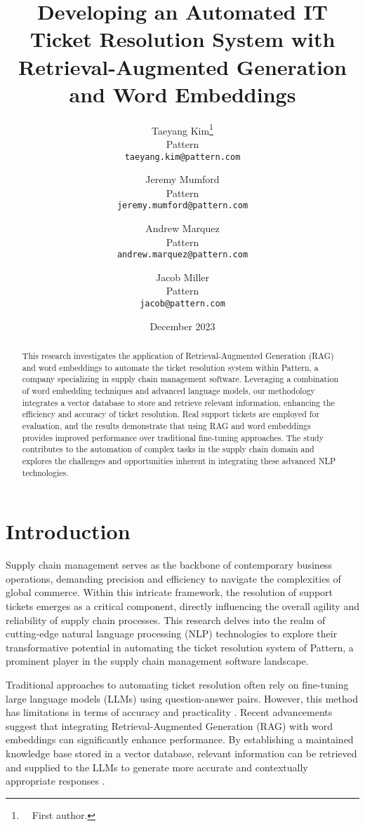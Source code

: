 \documentclass[11pt]{article}
\title{Developing an Automated IT Ticket Resolution System with Retrieval-Augmented Generation and Word Embeddings}
\author{
Taeyang Kim\thanks{\ \ First author.} \\
Pattern \\
\texttt{taeyang.kim@pattern.com}
\and
Jeremy Mumford \\
Pattern \\
\texttt{jeremy.mumford@pattern.com}
\and
Andrew Marquez \\
Pattern \\
\texttt{andrew.marquez@pattern.com}
\and
Jacob Miller \\
Pattern \\
\texttt{jacob@pattern.com}
}
\date{December 2023}
\begin{document}
\maketitle

\begin{abstract}
This research investigates the application of Retrieval-Augmented Generation (RAG) and word embeddings to automate the ticket resolution system within Pattern, a company specializing in supply chain management software. Leveraging a combination of word embedding techniques and advanced language models, our methodology integrates a vector database to store and retrieve relevant information, enhancing the efficiency and accuracy of ticket resolution. Real support tickets are employed for evaluation, and the results demonstrate that using RAG and word embeddings provides improved performance over traditional fine-tuning approaches. The study contributes to the automation of complex tasks in the supply chain domain and explores the challenges and opportunities inherent in integrating these advanced NLP technologies.
\end{abstract}

\section{Introduction}
Supply chain management serves as the backbone of contemporary business operations, demanding precision and efficiency to navigate the complexities of global commerce. Within this intricate framework, the resolution of support tickets emerges as a critical component, directly influencing the overall agility and reliability of supply chain processes. This research delves into the realm of cutting-edge natural language processing (NLP) technologies to explore their transformative potential in automating the ticket resolution system of Pattern, a prominent player in the supply chain management software landscape.

Traditional approaches to automating ticket resolution often rely on fine-tuning large language models (LLMs) using question-answer pairs. However, this method has limitations in terms of accuracy and practicality \cite{zhang2020enhancing}. Recent advancements suggest that integrating Retrieval-Augmented Generation (RAG) with word embeddings can significantly enhance performance. By establishing a maintained knowledge base stored in a vector database, relevant information can be retrieved and supplied to the LLMs to generate more accurate and contextually appropriate responses \cite{li2019leveraging}.
\end{document}
